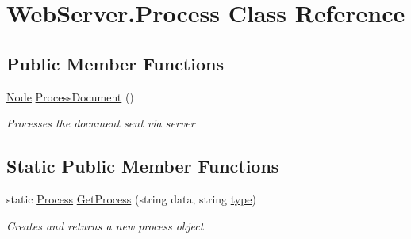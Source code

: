 \hypertarget{class_web_server_1_1_process}{}\section{Web\+Server.\+Process Class Reference}
\label{class_web_server_1_1_process}


 


\subsection*{Public Member Functions}
\begin{DoxyCompactItemize}
\item 
\hyperlink{class_web_server_1_1_node}{Node} \hyperlink{class_web_server_1_1_process_a1e01d70b31479a65280fbfbab855861b}{Process\+Document} ()
\begin{DoxyCompactList}\small\item\em Processes the document sent via server \end{DoxyCompactList}\end{DoxyCompactItemize}
\subsection*{Static Public Member Functions}
\begin{DoxyCompactItemize}
\item 
static \hyperlink{class_web_server_1_1_process}{Process} \hyperlink{class_web_server_1_1_process_a8426008d439d0beef6f59c757a2c22eb}{Get\+Process} (string data, string \hyperlink{class_web_server_1_1_process_ae8a1513688e4d9e54294cff90728ea91}{type})
\begin{DoxyCompactList}\small\item\em Creates and returns a new process object \end{DoxyCompactList}\end{DoxyCompactItemize}
